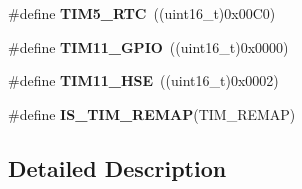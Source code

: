 \begin{DoxyCompactItemize}
\item 
\hypertarget{group___t_i_m___remap_gad95bd2157c29f94703c0942ca3d2b767}{\#define {\bfseries T\-I\-M5\-\_\-\-R\-T\-C}~((uint16\-\_\-t)0x00\-C0)}\label{group___t_i_m___remap_gad95bd2157c29f94703c0942ca3d2b767}

\item 
\hypertarget{group___t_i_m___remap_ga96850a4ae7ae9590f1ab9c04ec32bb06}{\#define {\bfseries T\-I\-M11\-\_\-\-G\-P\-I\-O}~((uint16\-\_\-t)0x0000)}\label{group___t_i_m___remap_ga96850a4ae7ae9590f1ab9c04ec32bb06}

\item 
\hypertarget{group___t_i_m___remap_ga1d6d3f53290050b59b202e6d72af673a}{\#define {\bfseries T\-I\-M11\-\_\-\-H\-S\-E}~((uint16\-\_\-t)0x0002)}\label{group___t_i_m___remap_ga1d6d3f53290050b59b202e6d72af673a}

\item 
\#define {\bfseries I\-S\-\_\-\-T\-I\-M\-\_\-\-R\-E\-M\-A\-P}(T\-I\-M\-\_\-\-R\-E\-M\-A\-P)
\end{DoxyCompactItemize}


\subsection{Detailed Description}


